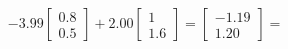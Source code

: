 \documentclass[preview]{standalone}
\begin{document}
\begin{align*}
-3.99 \begin{bmatrix} 0.8 \\ 0.5 \end{bmatrix} + 2.00 \begin{bmatrix} 1 \\ 1.6 \end{bmatrix} = \begin{bmatrix} -1.19 \\ 1.20 \end{bmatrix} =
\end{align*}
\end{document}
